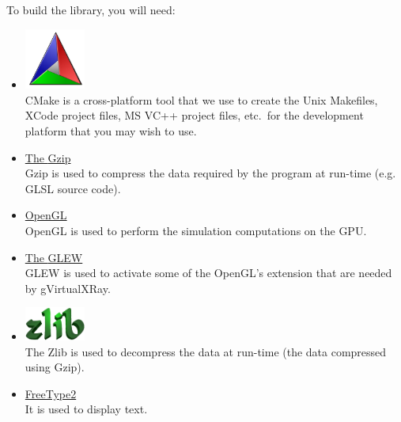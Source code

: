 \documentclass[11pt,oneside,a4paper,final]{article}
\begin{document}
To build the library, you will need:
\begin{itemize}
 \item \href{http://www.cmake.org/}{\includegraphics[width=2cm]{500px-Cmake.png}}~\cite{cmake}\\
 CMake is a cross-platform tool that we use to create the Unix Makefiles, XCode project files, MS VC++ project files, etc.~for the development platform that you may wish to use.

 \item \href{http://www.gzip.org/}{The \Gls{Gzip}}~\cite{gzip}\\
 \Gls{Gzip} is used to compress the data required by the program at run-time (e.g. \Gls{GLSL} source code).

 \item \href{http://www.opengl.org/}{OpenGL}~\cite{opengl}\\
 OpenGL is used to perform the simulation computations on the \Gls{GPU}.

 \item \href{http://glew.sourceforge.net/}{The \Gls{GLEW}}~\cite{glew}\\
 \Gls{GLEW} is used to activate some of the OpenGL's extension that are needed by gVirtualXRay.

 \item \href{http://www.zlib.net/}{\includegraphics[width=2cm]{Zlib_3D_green}}~\cite{zlib}\\
 The Zlib is used to decompress the data at run-time (the data compressed using \Gls{Gzip}).


  \item \href{http://www.freetype.org/}{FreeType2}~\cite{freetype}\\
 It is used to display text.
 \end{itemize}
\end{document}
